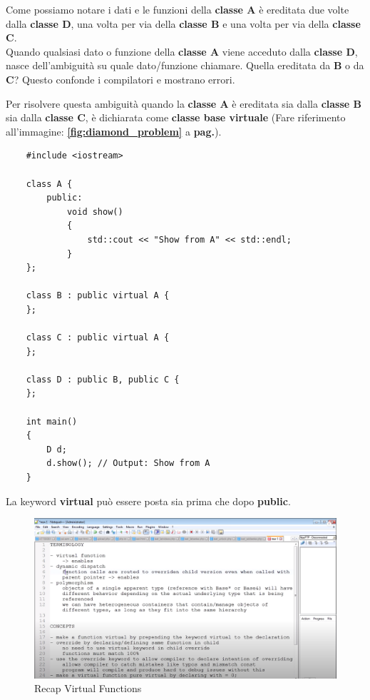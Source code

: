 \textsf{\small Come possiamo notare i dati e le funzioni della \textbf{classe A} è ereditata due volte dalla \textbf{classe D}, una volta per via della \textbf{classe B} e una volta per via della \textbf{classe C}.} \\

\textsf{\small Quando qualsiasi dato o funzione della \textbf{classe A} viene acceduto dalla \textbf{classe D}, nasce dell'ambiguità su quale dato/funzione chiamare. Quella ereditata da \textbf{B} o da \textbf{C}? Questo confonde i compilatori e mostrano errori.}

\textsf{\small Per risolvere questa ambiguità quando la \textbf{classe A} è ereditata sia dalla \textbf{classe B} sia dalla \textbf{classe C}, è dichiarata come \textbf{classe base virtuale} (Fare riferimento all'immagine: \textbf{\ref{fig:diamond_problem}} a \textbf{pag.\pageref{fig:diamond_problem}}).}

\begin{lstlisting}
	#include <iostream>
	
	class A {
		public:
			void show()
			{
				std::cout << "Show from A" << std::endl;
			}
	};

	class B : public virtual A {
	};

	class C : public virtual A {
	};

	class D : public B, public C {
	};

	int main()
	{
		D d;
		d.show(); // Output: Show from A
	}
\end{lstlisting}

\textsf{\small La keyword \textbf{virtual} può essere posta sia prima che dopo \textbf{public}.} \\

\begin{figure}[H]
	\centering
	\includegraphics[width=1.2\textwidth, height=1.2\textheight, keepaspectratio]{./imgs/virtual_functions_recap_terminology_and_concepts1.png}
	\caption{Recap Virtual Functions}
	\label{fig:virtual_functions_recap_terminology_and_concepts1}
\end{figure}

